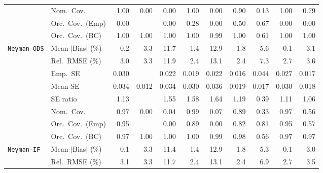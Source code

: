 \begin{landscape}
\begin{longtable}{llrrrrrrrrr}
 & Nom.\ Cov. & \cellcolor{rankone}1.00 & 0.00 & 0.00 & \cellcolor{rankone}1.00 & 0.00 & \cellcolor{rankone}0.90 & \cellcolor{rankthree}0.13 & \cellcolor{rankone}1.00 & \cellcolor{ranktwo}0.79 \\
 & Orc.\ Cov.\ (Emp) & 0.00 &  & 0.00 & \cellcolor{rankthree}0.28 & 0.00 & \cellcolor{ranktwo}0.50 & \cellcolor{rankone}0.67 & 0.00 & 0.00 \\
 & Orc.\ Cov.\ (BC) & \cellcolor{ranktwo}1.00 & \cellcolor{ranktwo}1.00 & \cellcolor{ranktwo}1.00 & \cellcolor{ranktwo}1.00 & \cellcolor{rankone}0.99 & \cellcolor{ranktwo}1.00 & \cellcolor{rankthree}0.61 & \cellcolor{ranktwo}1.00 & \cellcolor{ranktwo}1.00 \\
\addlinespace[2pt]
\quad \texttt{Neyman-ODS} & Mean $|$Bias$|$ (\%) & \cellcolor{ranktwo}0.2 & 3.3 & 11.7 & \cellcolor{rankthree}1.4 & 12.9 & 1.8 & 5.6 & \cellcolor{rankone}0.1 & 3.1 \\
 & Rel.\ RMSE (\%) & \cellcolor{rankthree}3.0 & 3.3 & 11.9 & \cellcolor{rankone}2.4 & 13.1 & \cellcolor{rankone}2.4 & 7.3 & \cellcolor{ranktwo}2.7 & 3.6 \\
 & Emp.\ SE & 0.030 &  & 0.022 & 0.019 & 0.022 & 0.016 & 0.044 & 0.027 & 0.017 \\
 & Mean SE & 0.034 & 0.012 & 0.034 & 0.030 & 0.036 & 0.019 & 0.017 & 0.030 & 0.018 \\
 & SE ratio & \cellcolor{rankthree}1.13 &  & 1.55 & 1.58 & 1.64 & 1.19 & 0.39 & \cellcolor{ranktwo}1.11 & \cellcolor{rankone}1.06 \\
 & Nom.\ Cov. & \cellcolor{rankone}0.97 & 0.00 & 0.04 & \cellcolor{ranktwo}0.99 & 0.07 & \cellcolor{rankthree}0.89 & 0.33 & \cellcolor{rankone}0.97 & 0.56 \\
 & Orc.\ Cov.\ (Emp) & \cellcolor{rankone}0.95 &  & 0.00 & \cellcolor{ranktwo}0.89 & 0.00 & \cellcolor{rankthree}0.82 & 0.81 & \cellcolor{rankone}0.95 & 0.57 \\
 & Orc.\ Cov.\ (BC) & \cellcolor{rankone}0.97 & 1.00 & 1.00 & 1.00 & \cellcolor{rankthree}0.99 & \cellcolor{ranktwo}0.98 & 0.56 & \cellcolor{rankone}0.97 & \cellcolor{rankone}0.97 \\
\addlinespace[2pt]
\quad \texttt{Neyman-IF} & Mean $|$Bias$|$ (\%) & \cellcolor{rankone}0.1 & 3.3 & 11.4 & \cellcolor{ranktwo}1.4 & 12.9 & \cellcolor{rankthree}1.8 & 5.3 & \cellcolor{rankone}0.1 & 3.0 \\
 & Rel.\ RMSE (\%) & \cellcolor{rankthree}3.1 & 3.3 & 11.7 & \cellcolor{rankone}2.4 & 13.1 & \cellcolor{rankone}2.4 & 6.9 & \cellcolor{ranktwo}2.7 & 3.5 \\

\end{longtable}
\end{landscape}
